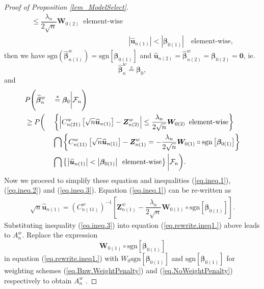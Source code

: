 \documentclass[ejs,authoryear,linksfromyear]{imsart}
\newcommand{\bnw}{\widehat{\bm{\beta}}_n^w} %
\newcommand{\cnwa}{C_{n(11)}^w}
\newcommand{\cnwc}{C_{n(21)}^w}
\newcommand{\znwa}{\bm{Z}_{n(1)}^w}
\newcommand{\znwb}{\bm{Z}_{n(2)}^w}
\newcommand{\huna}{\widehat{\bm{u}}_{n(1)}}
\newcommand{\hunb}{\widehat{\bm{u}}_{n(2)}}
\numberwithin{equation}{section}
\theoremstyle{plain}
\begin{document}
\begin{proof}[Proof of Proposition \ref{lem_ModelSelect}]
\begin{align}
	 \leq  \dfrac{\lambda_n}{2 \sqrt{n}} \bm{W}_{0(2)}
	 \,\,\, \text{element-wise} \label{eq.ineq.2} \\
	 &\left| \huna \right| < \left| \bm{\beta}_{0(1)} \right|
	 \quad \text{element-wise} \label{eq.ineq.3} ,
	 \end{align}
	 then we have $\text{sgn} \left( \widehat{\bm{\beta}}^w_{n(1)} \right)
	 = \text{sgn} \left[ \bm{\beta}_{0(1)} \right]$
	 and
	 $\hunb = \widehat{\bm{\beta}}^w_{n(2)} = \bm{\beta}_{0(2)} = \bm{0}$,
	 ie. 
	 $$
	 \bnw \stackrel{s}{=} \bm{\beta}_0,
	 $$
	 and 
	 \begin{alignat*}{2}
	 & P \Bigg(\bnw &&\stackrel{s}{=} \bm{\beta}_0 \bigg| \mathcal{F}_n \Bigg) \\
	 &\geq
	 P \bigg(
	 &&\left\{
	 \left| \cnwc \left[ \sqrt{n} \huna \right] - \znwb \right|
	 \leq  \dfrac{\lambda_n}{2 \sqrt{n}} \bm{W}_{0(2)}
	 \,\,\, \text{{\rm element-wise}}
	 \right\} \\
	 & &&\bigcap \left\{
	 \cnwa \left[ \sqrt{n} \huna \right] - \znwa 
	 = - \dfrac{\lambda_n}{2 \sqrt{n}}
	 \bm{W}_{0(1)} \circ
	 \text{sgn} \left[ \bm{\beta}_{0(1)} \right]
	 \right\} \\
	 & &&\bigcap \left\{
	 \left| \huna \right| < \left| \bm{\beta}_{0(1)} \right|
	 \,\,\, \text{{\rm element-wise}}
	 \right\}
	 \bigg| \mathcal{F}_n
	 \bigg).  %
	 \end{alignat*}
	 Now we proceed to simplify these equation and inequalities (\ref{eq.ineq.1}), (\ref{eq.ineq.2})  and (\ref{eq.ineq.3}). 
	 Equation (\ref{eq.ineq.1}) can be re-written as 
	 \begin{align} \label{eq.rewrite.ineq1.}
	 \sqrt{n} \huna 
	 = \left( \cnwa \right)^{-1}
	 \left[
	 	\znwa - \dfrac{\lambda_n}{2 \sqrt{n}}
	 	\bm{W}_{0(1)} \circ
	 	\text{sgn} \left[ \bm{\beta}_{0(1)} \right]
	 \right].
	 \end{align}
	 Substituting inequality (\ref{eq.ineq.3}) into equation (\ref{eq.rewrite.ineq1.}) above leads to $A_n^w$. Replace the expression
	 $$
	 \bm{W}_{0(1)} \circ \text{sgn} \left[\bm{\beta}_{0(1)} \right] 
	 $$
	 in equation (\ref{eq.rewrite.ineq1.}) with $W_0 \text{sgn} \left[ \bm{\beta}_{0(1)} \right]$ and $\text{sgn} \left[ \bm{\beta}_{0(1)} \right]$ for weighting schemes (\ref{eq.Bnw.WeightPenalty}) and (\ref{eq.NoWeightPenalty}) respectively to obtain $A_n^w$ .
	  

\end{proof}
\end{document}
